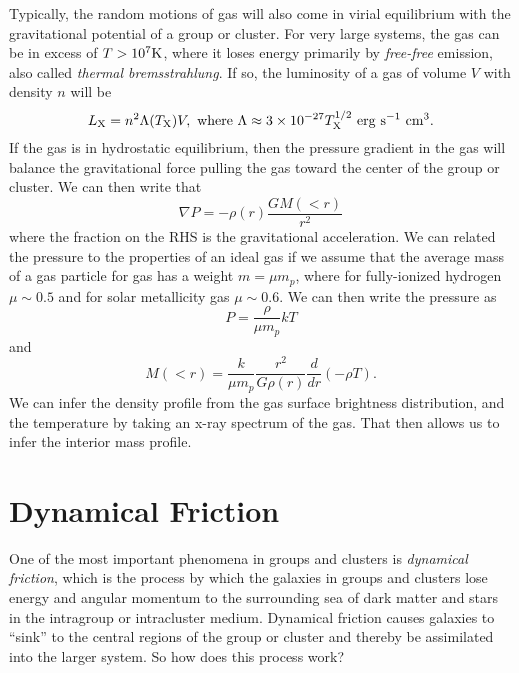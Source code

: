 \documentclass[]{article}
\begin{document}
Typically, the random motions of gas will also come in 
virial equilibrium with the gravitational potential of a
group or cluster.  For very large systems, the gas can be
in excess of $T>10^{7}\mathrm{K}$, where it loses energy primarily
by {\it free-free} emission, also called {\it thermal bremsstrahlung}.
If so, the luminosity of a gas of volume $V$ with density $n$ will be
\begin{equation}
L_{\mathrm{X}} = n^2 \Lambda(T_{\mathrm{X}}) V,~\mathrm{where}~\Lambda\approx3\times10^{-27}T_{\mathrm{X}}^{1/2}~\mathrm{erg}~\mathrm{s}^{-1}~\mathrm{cm}^{3}.
\end{equation}
\noindent
If the gas is in hydrostatic equilibrium, then
the pressure gradient in the gas will balance the gravitational
force pulling the gas toward the center of the group or cluster.
We can then write that
\begin{equation}
\nabla P = -\rho(r) \frac{GM(<r)}{r^2}
\end{equation}
\noindent
where the fraction on the RHS is the gravitational acceleration.
We can related the pressure to the properties of an ideal gas
if we assume that the average mass of a gas particle for 
gas has a weight $m = \mu m_{p}$, where for fully-ionized
hydrogen $\mu\sim0.5$ and for solar metallicity gas $\mu\sim0.6$.
We can then write the pressure as
\begin{equation}
P = \frac{\rho}{\mu m_{p}}kT
\end{equation}
\noindent
and
\begin{equation}
M(<r) = \frac{k}{\mu m_p}\frac{r^2}{G \rho(r)} \frac{d}{dr}(-\rho T).
\end{equation}
\noindent
We can infer the density profile from the gas surface brightness
distribution, and the temperature by taking an x-ray spectrum of the
gas.  That then allows us to infer the interior mass profile.

\section{Dynamical Friction}

One of the most important phenomena in groups and clusters is
{\it dynamical friction}, which is the process by which the
galaxies in groups and clusters lose energy and angular momentum
to the surrounding sea of dark matter and stars in the intragroup
or intracluster medium. Dynamical friction causes galaxies to ``sink''
to the central regions of the group or cluster and thereby be
assimilated into the larger system.  So how does this process work?
\end{document}
